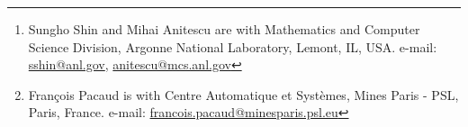 
\documentclass{IEEEtran} %
\author{
  Sungho Shin, François Pacaud, and Mihai Anitescu
  \thanks{
    Sungho Shin and Mihai Anitescu are with Mathematics and Computer Science Division,  Argonne National Laboratory, Lemont, IL, USA. e-mail: \url{sshin@anl.gov}, \url{anitescu@mcs.anl.gov}
  }
  \thanks{
    François Pacaud is with Centre Automatique et Systèmes, Mines Paris - PSL, Paris, France. e-mail: \url{francois.pacaud@minesparis.psl.eu}
  }
}




\makeatletter
\let\old@ps@headings\ps@headings
\let\old@ps@IEEEtitlepagestyle\ps@IEEEtitlepagestyle
\def\psccfooter#1{%
    \def\ps@headings{%
        \old@ps@headings%
        \def\@oddfoot{\strut\hfill#1\hfill\strut}%
        \def\@evenfoot{\strut\hfill#1\hfill\strut}%
    }%
    \def\ps@IEEEtitlepagestyle{%
        \old@ps@IEEEtitlepagestyle%
        \def\@oddfoot{\strut\hfill#1\hfill\strut}%
        \def\@evenfoot{\strut\hfill#1\hfill\strut}%
    }%
    \ps@headings%
}
\makeatother


\usepackage{amsmath,amssymb,amsthm,amsfonts} %
\usepackage[linktocpage=true,colorlinks=true,linkcolor=blue,citecolor=blue,urlcolor=blue]{hyperref}

